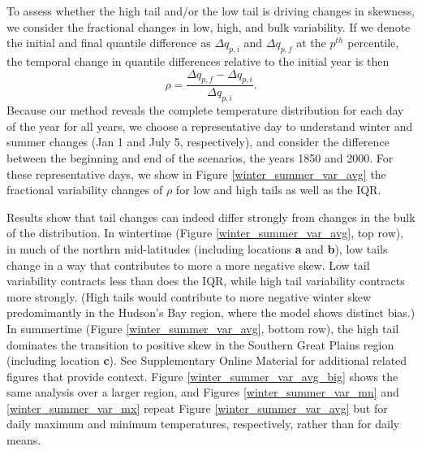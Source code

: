 \documentclass{ametsoc}
\begin{document}
To assess whether the high tail and/or the low tail is driving changes in skewness, we consider the fractional changes in low, high, and bulk variability.
If we denote the initial and final quantile difference as $\Delta q_{p, i}$ and $\Delta q_{p, f}$ at the $p^{th}$ percentile, the temporal change in quantile differences relative to the initial year is then
\begin{equation}
	\rho = \frac{\Delta q_{p, f} - \Delta q_{p, i}}{\Delta q_{p, i}}.
\label{eq:relnorm}
\end{equation}
 Because our method reveals the complete temperature distribution for each day of the year for all years, we choose a representative day to understand winter and summer changes (Jan 1 and July 5, respectively), and consider the difference between the beginning and end of the scenarios, the years 1850 and 2000. For these representative days, we show in Figure \ref{winter_summer_var_avg} the fractional variability changes of $\rho$ for low and high tails as well as the IQR. 

Results  show that tail changes can indeed differ strongly from changes in the bulk of the distribution.  In wintertime (Figure \ref{winter_summer_var_avg}, top row), in much of the northrn mid-latitudes (including locations \textbf{a} and \textbf{b}), low tails change in a way that contributes to more a more negative skew. Low tail variability contracts less than does the IQR, while high tail variability contracts more strongly. (High tails would contribute to more negative winter skew predomimantly in the Hudson's Bay region, where the model shows distinct bias.) In summertime (Figure \ref{winter_summer_var_avg}, bottom row), the high tail dominates the transition to positive skew in the Southern Great Plains region (including location \textbf{c}).
See Supplementary Online Material for additional related figures that provide context.  Figure \ref{winter_summer_var_avg_big} shows the same analysis over a larger region, and Figures \ref{winter_summer_var_mn} and \ref{winter_summer_var_mx} repeat Figure \ref{winter_summer_var_avg} but for daily maximum and minimum temperatures, respectively, rather than for daily means. 
\end{document}
